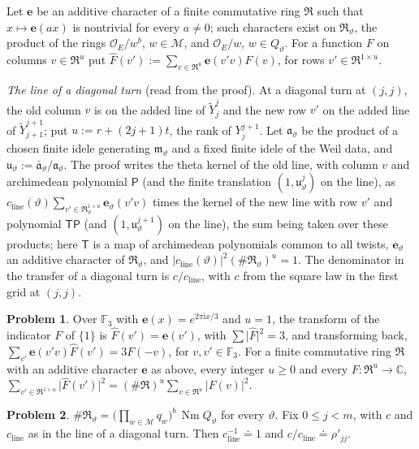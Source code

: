\documentclass[reqno]{amsart}
\theoremstyle{definition}
\newtheorem{problem}{Problem}[section]
\theoremstyle{plain}
\newcommand{\C}{\mathbb C}
\newcommand{\F}{\mathbb F}
\newcommand{\Oc}{\mathcal O}
\newcommand{\Nm}{\operatorname{Nm}}
\newcommand{\cM}{\mathcal M}
\newcommand{\Yt}{\widetilde Y}
\newcommand{\Rm}{\mathfrak R}
\begin{document}
Let \(\mathbf e\) be an additive character of a finite commutative ring \(\Rm\) such that \(x \mapsto \mathbf e(ax)\) is nontrivial for every \(a \ne 0\); such characters exist on \(\Rm_\vartheta\), the product of the rings \(\Oc_E/w^b\), \(w \in \cM\), and \(\Oc_E/w\), \(w \in Q_\vartheta\).  For a function \(F\) on columns \(v \in \Rm^u\) put \(\hat F(v') := \sum_{v \in \Rm^u}\mathbf e(v'v)F(v)\), for rows \(v' \in \Rm^{1\times u}\).

\emph{The line of a diagonal turn} (read from the proof).  At a diagonal turn at \((j, j)\), the old column \(v\) is on the added line of \(\Yt^j_j\) and the new row \(v'\) on the added line of \(\Yt^{j+1}_{j+1}\); put \(u := r + (2j+1)t\), the rank of \(Y^{j+1}_j\).  Let \(\mathfrak a_\vartheta\) be the product of a chosen finite idele generating \(\mathfrak m_\vartheta\) and a fixed finite idele of the Weil data, and \(\mathfrak u_\vartheta := \bar{\mathfrak a}_\vartheta/\mathfrak a_\vartheta\).  The proof writes the theta kernel of the old line, with column \(v\) and archimedean polynomial \(\mathsf P\) (and the finite translation \((1, \mathfrak u_\vartheta^j)\) on the line), as \(c_{\mathrm{line}}(\vartheta)\sum_{v' \in \Rm_\vartheta^{1\times u}}\mathbf e_\vartheta(v'v)\) times the kernel of the new line with row \(v'\) and polynomial \(\mathsf T\mathsf P\) (and \((1, \mathfrak u_\vartheta^{j+1})\) on the line), the sum being taken over these products; here \(\mathsf T\) is a map of archimedean polynomials common to all twists, \(\mathbf e_\vartheta\) an additive character of \(\Rm_\vartheta\), and \(\lvert c_{\mathrm{line}}(\vartheta)\rvert^2(\#\Rm_\vartheta)^u = 1\).  The denominator in the transfer of a diagonal turn is \(c/c_{\mathrm{line}}\), with \(c\) from the square law in the first grid at \((j, j)\).

\begin{problem}\label{pr:line}
Over \(\F_3\) with \(\mathbf e(x) = e^{2\pi \mathrm i x/3}\) and \(u = 1\), the transform of the indicator \(F\) of \(\{1\}\) is \(\hat F(v') = \mathbf e(v')\), with \(\sum\lvert\hat F\rvert^2 = 3\), and transforming back, \(\sum_{v'}\mathbf e(v'v)\hat F(v') = 3F(-v)\), for \(v, v' \in \F_3\).  For a finite commutative ring \(\Rm\) with an additive character \(\mathbf e\) as above, every integer \(u \ge 0\) and every \(F\colon \Rm^u \to \C\), \(\sum_{v' \in \Rm^{1\times u}}\lvert\hat F(v')\rvert^2 = (\#\Rm)^u\sum_{v \in \Rm^u}\lvert F(v)\rvert^2\).
\end{problem}

\begin{problem}\label{pr:line-scalar}
\(\#\Rm_\vartheta = \bigl(\prod_{w \in \cM} q_w\bigr)^b\,\Nm Q_\vartheta\) for every \(\vartheta\).  Fix \(0 \le j < m\), with \(c\) and \(c_{\mathrm{line}}\) as in the line of a diagonal turn.  Then \(c_{\mathrm{line}}^{-1} \doteq 1\) and \(c/c_{\mathrm{line}} \doteq \rho'_{jj}\).
\end{problem}
\end{document}
